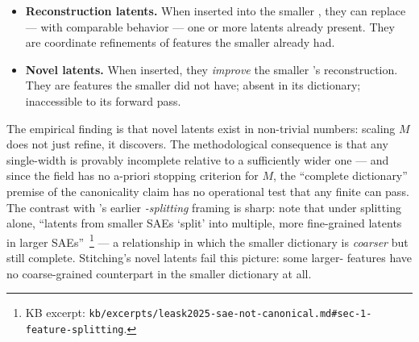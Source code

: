 \begin{itemize}
  \item \textbf{Reconstruction latents.} When inserted into the
    smaller , they can replace --- with comparable behavior ---
    one or more latents already present. They are coordinate
    refinements of features the smaller  already had.
  \item \textbf{Novel latents.} When inserted, they
    \emph{improve} the smaller 's reconstruction. They are
    features the smaller  did not have; absent in its dictionary;
    inaccessible to its forward pass.
\end{itemize}

\noindent The empirical finding is that novel latents exist in
non-trivial numbers: scaling $M$ does not just refine, it discovers.
The methodological consequence
\citep[\S 1]{leask2025-sae-not-canonical} is that any single-width 
is provably incomplete relative to a sufficiently wider one --- and
since the field has no a-priori stopping criterion for $M$, the
``complete dictionary'' premise of the canonicality claim has no
operational test that any finite  can pass. The contrast with
\citet{bricken2023-monosemanticity}'s earlier \emph{-splitting}
framing is sharp:
\citeauthor{leask2025-sae-not-canonical} note that under 
splitting alone, ``latents from smaller SAEs `split' into multiple,
more fine-grained latents in larger
SAEs''~\citep[\S 1]{leask2025-sae-not-canonical}\footnote{KB excerpt:
\nolinkurl{kb/excerpts/leask2025-sae-not-canonical.md#sec-1-feature-splitting}.}
--- a relationship in which the smaller dictionary is \emph{coarser}
but still complete. Stitching's novel latents fail this picture: some
larger- features have no coarse-grained counterpart in the smaller
dictionary at all.

